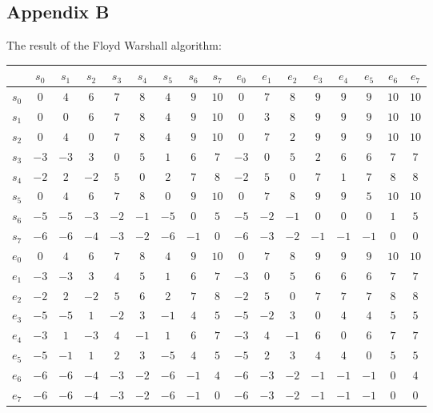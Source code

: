 \documentclass{article}
\theoremstyle{definition}
\begin{document}
\subsection{Appendix B}
\label{appendix:b}
The result of the Floyd Warshall algorithm:\\
\begin{tabular}{c | cccccccccccccccc}
	&$s_0$	&$s_1$ &$s_2$ &$s_3$ &$s_4$ &$s_5$ &$s_6$ &$s_7$ &$e_0$ &$e_1$ &$e_2$ &$e_3$ &$e_4$ &$e_5$ &$e_6$ &$e_7$\\
\hline
$s_0$	&$0$	&$4$	&$6$	&$7$	&$8$	&$4$	&$9$	&$10$	&$0$	&$7$	&$8$	&$9$	&$9$	&$9$	&$10$	&$10$	\\
$s_1$	&$0$	&$0$	&$6$	&$7$	&$8$	&$4$	&$9$	&$10$	&$0$	&$3$	&$8$	&$9$	&$9$	&$9$	&$10$	&$10$	\\
$s_2$	&$0$	&$4$	&$0$	&$7$	&$8$	&$4$	&$9$	&$10$	&$0$	&$7$	&$2$	&$9$	&$9$	&$9$	&$10$	&$10$	\\
$s_3$	&$-3$	&$-3$	&$3$	&$0$	&$5$	&$1$	&$6$	&$7$	&$-3$	&$0$	&$5$	&$2$	&$6$	&$6$	&$7$	&$7$\\
$s_4$	&$-2$	&$2$	&$-2$	&$5$	&$0$	&$2$	&$7$	&$8$	&$-2$	&$5$	&$0$	&$7$	&$1$	&$7$	&$8$	&$8$\\
$s_5$	&$0$	&$4$	&$6$	&$7$	&$8$	&$0$	&$9$	&$10$	&$0$	&$7$	&$8$	&$9$	&$9$	&$5$	&$10$	&$10$	\\
$s_6$	&$-5$	&$-5$	&$-3$	&$-2$	&$-1$	&$-5$	&$0$	&$5$	&$-5$	&$-2$	&$-1$	&$0$	&$0$	&$0$	&$1$	&$5$\\
$s_7$	&$-6$	&$-6$	&$-4$	&$-3$	&$-2$	&$-6$	&$-1$	&$0$	&$-6$	&$-3$	&$-2$	&$-1$	&$-1$	&$-1$	&$0$	&$0$\\
$e_0$	&$0$	&$4$	&$6$	&$7$	&$8$	&$4$	&$9$	&$10$	&$0$	&$7$	&$8$	&$9$	&$9$	&$9$	&$10$	&$10$	\\
$e_1$	&$-3$	&$-3$	&$3$	&$4$	&$5$	&$1$	&$6$	&$7$	&$-3$	&$0$	&$5$	&$6$	&$6$	&$6$	&$7$	&$7$\\
$e_2$	&$-2$	&$2$	&$-2$	&$5$	&$6$	&$2$	&$7$	&$8$	&$-2$	&$5$	&$0$	&$7$	&$7$	&$7$	&$8$	&$8$\\
$e_3$	&$-5$	&$-5$	&$1$	&$-2$	&$3$	&$-1$	&$4$	&$5$	&$-5$	&$-2$	&$3$	&$0$	&$4$	&$4$	&$5$	&$5$\\
$e_4$	&$-3$	&$1$	&$-3$	&$4$	&$-1$	&$1$	&$6$	&$7$	&$-3$	&$4$	&$-1$	&$6$	&$0$	&$6$	&$7$	&$7$\\
$e_5$	&$-5$	&$-1$	&$1$	&$2$	&$3$	&$-5$	&$4$	&$5$	&$-5$	&$2$	&$3$	&$4$	&$4$	&$0$	&$5$	&$5$\\
$e_6$	&$-6$	&$-6$	&$-4$	&$-3$	&$-2$	&$-6$	&$-1$	&$4$	&$-6$	&$-3$	&$-2$	&$-1$	&$-1$	&$-1$	&$0$	&$4$\\
$e_7$	&$-6$	&$-6$	&$-4$	&$-3$	&$-2$	&$-6$	&$-1$	&$0$	&$-6$	&$-3$	&$-2$	&$-1$	&$-1$	&$-1$	&$0$	&$0$\\
\end{tabular}
\end{document}

